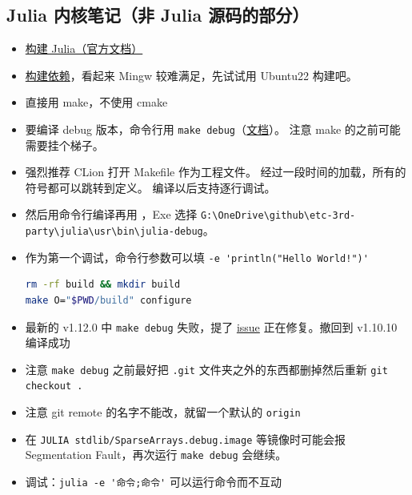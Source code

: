 \subsection{Julia 内核笔记（非 Julia 源码的部分）}
\begin{itemize}
\item \href{https://docs.julialang.org/en/v1/devdocs/build/build/}{构建 Julia（官方文档）}
\item \href{https://docs.julialang.org/en/v1/devdocs/build/build/#Required-Build-Tools-and-External-Libraries}{构建依赖}，看起来 Mingw 较难满足，先试试用 Ubuntu22 构建吧。
\item 直接用 make，不使用 cmake
\item 要编译 debug 版本，命令行用 \verb`make debug`（\href{https://docs.julialang.org/en/v1/devdocs/backtraces/}{文档}）。 注意 make 的之前可能需要挂个梯子。
\item 强烈推荐 CLion 打开 Makefile 作为工程文件。 经过一段时间的加载，所有的符号都可以跳转到定义。 编译以后支持逐行调试。
\item 然后用命令行编译再用 ，Exe 选择 \verb`G:\OneDrive\github\etc-3rd-party\julia\usr\bin\julia-debug`。
\item 作为第一个调试，命令行参数可以填 \verb`-e 'println("Hello World!")'`
\begin{lstlisting}[language=bash]
rm -rf build && mkdir build
make O="$PWD/build" configure
\end{lstlisting}
\item 最新的 v1.12.0 中 \verb`make debug` 失败，提了 \href{https://github.com/JuliaLang/julia/issues/57675}{issue} 正在修复。撤回到 v1.10.10 编译成功
\item 注意 \verb`make debug` 之前最好把 \verb`.git` 文件夹之外的东西都删掉然后重新 \verb`git checkout .`
\item 注意 git remote 的名字不能改，就留一个默认的 \verb`origin`
\item 在 \verb`JULIA stdlib/SparseArrays.debug.image` 等镜像时可能会报 Segmentation Fault，再次运行 \verb`make debug` 会继续。

\item 调试：\verb`julia -e '命令;命令'` 可以运行命令而不互动
\end{itemize}

